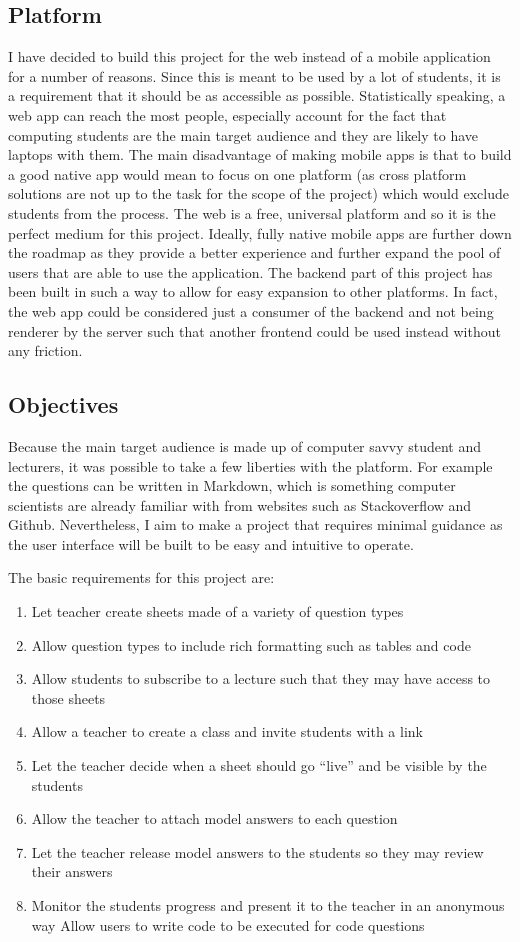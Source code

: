 \documentclass[12pt]{article}
\begin{document}
\subsection{Platform}
I have decided to build this project for the web instead of a mobile application for a number of reasons. Since this is meant to be used by a lot of students, it is a requirement that it should be as accessible as possible. Statistically speaking, a web app can reach the most people, especially account for the fact that computing students are the main target audience and they are likely to have laptops with them.
The main disadvantage of making mobile apps is that to build a good native app would mean to focus on one platform (as cross platform solutions are not up to the task for the scope of the project) which would exclude students from the process. The web is a free, universal platform and so it is the perfect medium for this project.
Ideally, fully native mobile apps are further down the roadmap as they provide a better experience and further expand the pool of users that are able to use the application.
The backend part of this project has been built in such a way to allow for easy expansion to other platforms. In fact, the web app could be considered just a consumer of the backend and not being renderer by the server such that another frontend could be used instead without any friction.

\subsection{Objectives}
Because the main target audience is made up of computer savvy student and lecturers, it was possible to take a few liberties with the platform. For example the questions can be written in Markdown, which is something computer scientists are already familiar with from websites such as Stackoverflow and Github.
Nevertheless, I aim to make a project that requires minimal guidance as the user interface will be built to be easy and intuitive to operate.

The basic requirements for this project are:
\begin{enumerate}
\item Let teacher create sheets made of a variety of question types
\item 	Allow question types to include rich formatting such as tables and code
\item 	Allow students to subscribe to a lecture such that they may have access to those sheets
\item 	Allow a teacher to create a class and invite students with a link
\item 	Let the teacher decide when a sheet should go “live” and be visible by the students
\item 	Allow the teacher to attach model answers to each question
\item Let the teacher release model answers to the students so they may review their answers
\item 	Monitor the students progress and present it to the teacher in an anonymous way
Allow users to write code to be executed for code questions

\end{enumerate}
\end{document}
